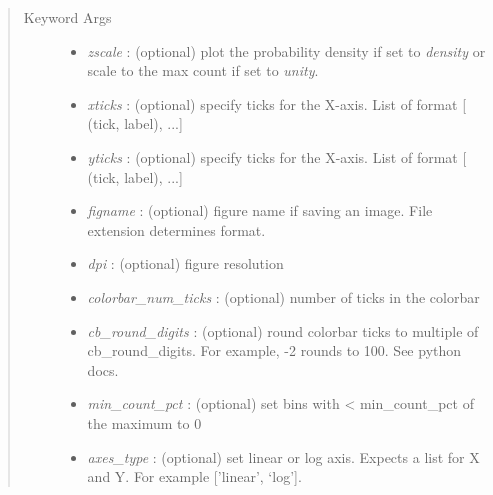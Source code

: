 \documentclass[letterpaper,10pt,english]{sphinxmanual}
\begin{document}
\begin{fulllineitems}
\begin{quote}
\begin{description}
\begin{itemize}
\end{itemize}

\item[{Keyword Args}] \leavevmode\begin{itemize}
\item {} 
\emph{zscale} :                            (optional) plot the probability density if set to \emph{density} or scale to the max count if set to \emph{unity}.

\item {} 
\emph{xticks} :                            (optional) specify ticks for the X-axis. List of format {[} (tick, label), ...{]}

\item {} 
\emph{yticks} :                            (optional) specify ticks for the X-axis. List of format {[} (tick, label), ...{]}

\item {} 
\emph{figname} :                           (optional) figure name if saving an image. File extension determines format.

\item {} 
\emph{dpi} :                                       (optional) figure resolution

\item {} 
\emph{colorbar\_num\_ticks} :        (optional) number of ticks in the colorbar

\item {} 
\emph{cb\_round\_digits} :           (optional) round colorbar ticks to multiple of cb\_round\_digits. For example, -2 rounds to 100. See python docs.

\item {} 
\emph{min\_count\_pct} :                     (optional) set bins with \textless{} min\_count\_pct of the maximum to 0

\item {} 
\emph{axes\_type} :                         (optional) set linear or log axis. Expects a list for X and Y. For example {[}'linear', `log'{]}.

\end{itemize}

\end{description}\end{quote}

\end{fulllineitems}
\end{document}
